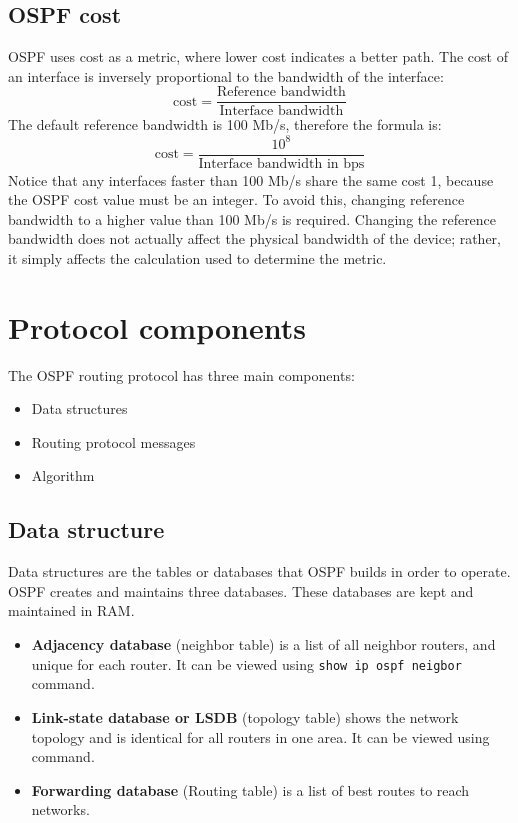 \subsection{OSPF cost}
OSPF uses cost as a metric, where lower cost indicates a better path. The cost of an interface is inversely proportional to the bandwidth of the interface:%
\[ \text{cost}=\frac{\text{Reference bandwidth}}{\text{Interface bandwidth}} \]
The default reference bandwidth is 100 Mb/s, therefore the formula is:
\[ \text{cost}=\frac{10^8}{\text{Interface bandwidth in bps}} \]
Notice that any interfaces faster than 100 Mb/s share the same cost 1, because the OSPF cost value must be an integer. To avoid this, changing reference bandwidth to a higher value than 100 Mb/s is required. \note Changing the reference bandwidth does not actually affect the physical bandwidth of the device; rather, it simply affects the calculation used to determine the metric.

\section{Protocol components}
The OSPF routing protocol has three main components:
\begin{itemize}
	\item Data structures
	\item Routing protocol messages
	\item Algorithm
	\end{itemize}
\subsection{Data structure}
Data structures are the tables or databases that OSPF builds in order to operate. OSPF creates and maintains three databases. These databases are kept and maintained in RAM.
\begin{itemize}
	\item \textbf{Adjacency database} (neighbor table) is a list of all neighbor routers, and unique for each router. It can be viewed using \texttt{show ip ospf neigbor} command.
	\item \textbf{Link-state database or LSDB} (topology table) shows the network topology and is identical for all routers in one area. It can be viewed using  command.
	\item \textbf{Forwarding database} (Routing table) is a list of best routes to reach networks.
\end{itemize}
